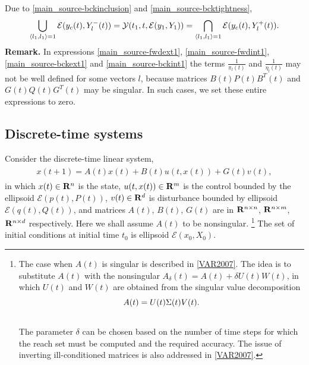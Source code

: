 \documentclass[letterpaper,10pt,english]{sphinxmanual}
\begin{document}
Due to \eqref{main_source-bckinclusion} and \eqref{main_source-bcktightness},
\begin{gather}
\begin{split}\bigcup_{\langle l_1,l_1\rangle=1}{\mathcal E}(y_c(t),Y^-_l(t)) =
{\mathcal Y}(t_1,t,{\mathcal E}(y_1,Y_1)) =
\bigcap_{\langle l_1,l_1\rangle=1}{\mathcal E}(y_c(t),Y^+_l(t)).\end{split}\notag
\end{gather}
\textbf{Remark.} In expressions \eqref{main_source-fwdext1}, \eqref{main_source-fwdint1}, \eqref{main_source-bckext1} and
\eqref{main_source-bckint1} the terms $\frac{1}{\pi_l(t)}$ and
$\frac{1}{\eta_l(t)}$ may not be well defined for some vectors
$l$, because matrices $B(t)P(t)B^T(t)$ and
$G(t)Q(t)G^T(t)$ may be singular. In such cases, we set these
entire expressions to zero.


\subsection{Discrete-time systems}
\label{main_source:discrete-time-systems}
Consider the discrete-time linear system,
\label{main_source:equation-dtsystem}\begin{gather}
\begin{split}x(t+1) = A(t)x(t) + B(t)u(t,x(t)) + G(t)v(t),\end{split}\label{main_source-dtsystem}
\end{gather}
in which $x(t)\in{\bf R}^n$ is the state,
$u(t, x(t))\in{\bf R}^m$ is the control bounded by the ellipsoid
${\mathcal E}(p(t),P(t))$, $v(t)\in{\bf R}^d$ is disturbance
bounded by ellipsoid ${\mathcal E}(q(t),Q(t))$, and matrices
$A(t)$, $B(t)$, $G(t)$ are in
${\bf R}^{n\times n}$, ${\bf R}^{n\times m}$,
${\bf R}^{n\times d}$ respectively. Here we shall assume
$A(t)$ to be nonsingular. \footnote{
The case when $A(t)$ is singular is described in {\hyperref[main_source:var2007]{{[}VAR2007{]}}}.
The idea is to substitute $A(t)$ with the
nonsingular $A_\delta(t) = A(t) + \delta U(t)W(t)$, in which
$U(t)$ and $W(t)$ are obtained from the singular value
decomposition
\begin{gather}
\begin{split}A(t) = U(t)\Sigma(t)V(t) .\end{split}\notag\\\begin{split}\end{split}\notag
\end{gather}
The parameter $\delta$ can be chosen based on the number of
time steps for which the reach set must be computed and the required
accuracy. The issue of inverting ill-conditioned matrices is also
addressed in {\hyperref[main_source:var2007]{{[}VAR2007{]}}}.
} The set of initial conditions at
initial time $t_0$ is ellipsoid ${\mathcal E}(x_0,X_0)$.
\end{document}
